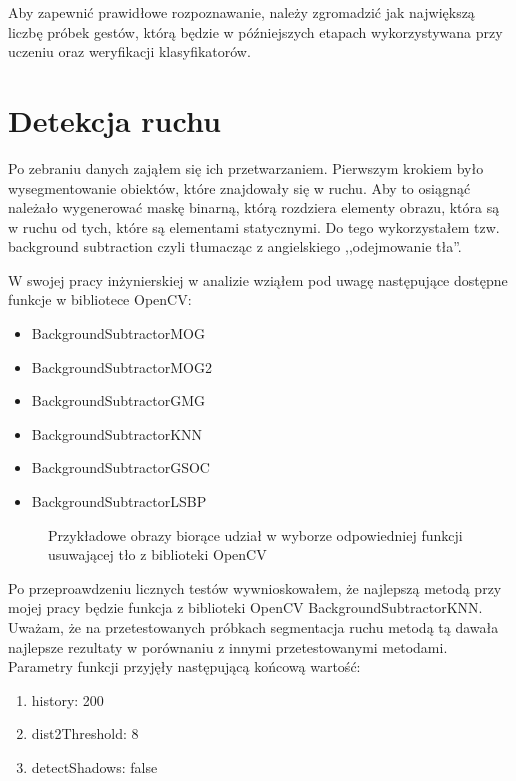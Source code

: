 \documentclass[a4paper,12pt,twoside,openany]{report}
\newcommand{\ImgPath}{.}
\begin{document}
Aby zapewnić prawidłowe rozpoznawanie, należy zgromadzić jak największą liczbę próbek gestów, którą będzie w późniejszych etapach wykorzystywana przy uczeniu oraz weryfikacji klasyfikatorów.

\section{Detekcja ruchu}
Po zebraniu danych zająłem się ich przetwarzaniem. Pierwszym krokiem było wysegmentowanie obiektów, które znajdowały się w ruchu. Aby to osiągnąć należało wygenerować maskę binarną, którą rozdziera elementy obrazu, która są w ruchu od tych, które są elementami statycznymi. Do tego wykorzystałem tzw. background subtraction czyli tłumacząc z angielskiego ,,odejmowanie tła''.

W swojej pracy inżynierskiej w analizie wziąłem pod uwagę następujące dostępne funkcje w bibliotece OpenCV:

\begin{itemize} 
	\item BackgroundSubtractorMOG
	\item BackgroundSubtractorMOG2
	\item BackgroundSubtractorGMG
	\item BackgroundSubtractorKNN
	\item BackgroundSubtractorGSOC
	\item BackgroundSubtractorLSBP
\end{itemize} 

\begin{figure}[H]
	\centering
	\caption{Przykładowe obrazy biorące udział w wyborze odpowiedniej funkcji usuwającej tło z biblioteki OpenCV}
\end{figure}

Po przeproawdzeniu licznych testów wywnioskowałem, że najlepszą metodą przy mojej pracy będzie funkcja z biblioteki OpenCV BackgroundSubtractorKNN. Uważam, że na przetestowanych próbkach segmentacja ruchu metodą tą dawała najlepsze rezultaty w porównaniu z innymi przetestowanymi metodami. Parametry funkcji przyjęły następującą końcową wartość:
\begin{enumerate}
	\item history: 200
	\item dist2Threshold: 8
	\item detectShadows: false
\end{enumerate}
\end{document}
